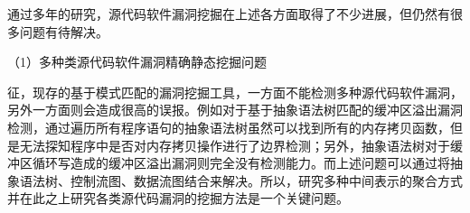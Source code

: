 通过多年的研究，源代码软件漏洞挖掘在上述各方面取得了不少进展，但仍然有很多问题有待解决。




（1）多种类源代码软件漏洞精确静态挖掘问题

征，现存的基于模式匹配的漏洞挖掘工具，一方面不能检测多种源代码软件漏洞，另外一方面则会造成很高的误报。例如对于基于抽象语法树匹配的缓冲区溢出漏洞检测，通过遍历所有程序语句的抽象语法树虽然可以找到所有的内存拷贝函数，但是无法探知程序中是否对内存拷贝操作进行了边界检测；另外，抽象语法树对于缓冲区循环写造成的缓冲区溢出漏洞则完全没有检测能力。而上述问题可以通过将抽象语法树、控制流图、数据流图结合来解决。所以，研究多种中间表示的聚合方式并在此之上研究各类源代码漏洞的挖掘方法是一个关键问题。

